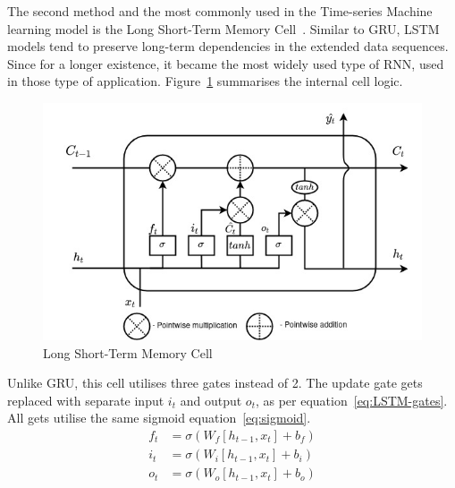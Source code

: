 The second method and the most commonly used in the Time-series Machine learning model is the Long Short-Term Memory Cell~\cite{LSTM_Hochreiter1997}.
Similar to GRU, LSTM models tend to preserve long-term dependencies in the extended data sequences.
Since for a longer existence, it became the most widely used type of RNN, used in those type of application.
Figure~\ref{fig:LSTM-cell} summarises the internal cell logic.
\begin{figure}[ht]%
    \centering
    \includegraphics[width=0.7\linewidth]{II_Body/LSTM/images/LSTM.jpg}
    \caption{Long Short-Term Memory Cell}
    \label{fig:LSTM-cell}
\end{figure}
Unlike GRU, this cell utilises three gates instead of 2.
The update gate gets replaced with separate input $i_t$ and output $o_t$, as per equation~\ref{eq:LSTM-gates}.
All gets utilise the same sigmoid equation~\ref{eq:sigmoid}.
\begin{equation}
    \begin{split}
        f_t &= \sigma \left(W_f \left[h_{t-1}, x_t \right] + b_f \right) \\
        i_t &= \sigma \left(W_i \left[h_{t-1}, x_t \right] + b_i \right) \\
        o_t &= \sigma \left(W_o \left[h_{t-1}, x_t \right] + b_o \right) \\    
    \end{split}
    \label{eq:LSTM-gates}
\end{equation}
